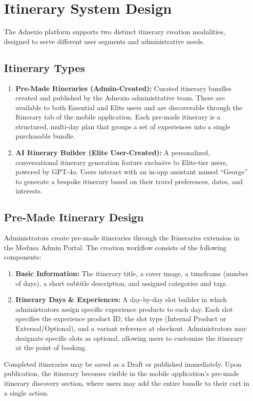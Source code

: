 \section{Itinerary System Design}
The Adnexio platform supports two distinct itinerary creation modalities, designed to serve different user segments and administrative needs.

\newpage
\subsection{Itinerary Types}
\begin{enumerate}
    \item \textbf{Pre-Made Itineraries (Admin-Created):} Curated itinerary bundles created and published by the Adnexio administrative team. These are available to both Essential and Elite users and are discoverable through the Itinerary tab of the mobile application. Each pre-made itinerary is a structured, multi-day plan that groups a set of experiences into a single purchasable bundle.
    \item \textbf{AI Itinerary Builder (Elite User-Created):} A personalized, conversational itinerary generation feature exclusive to Elite-tier users, powered by GPT-4o. Users interact with an in-app assistant named ``George'' to generate a bespoke itinerary based on their travel preferences, dates, and interests.
\end{enumerate}

\subsection{Pre-Made Itinerary Design}
Administrators create pre-made itineraries through the Itineraries extension in the Medusa Admin Portal. The creation workflow consists of the following components:
\begin{enumerate}
    \item \textbf{Basic Information:} The itinerary title, a cover image, a timeframe (number of days), a short subtitle description, and assigned categories and tags.
    \item \textbf{Itinerary Days \& Experiences:} A day-by-day slot builder in which administrators assign specific experience products to each day. Each slot specifies the experience product ID, the slot type (Internal Product or External/Optional), and a variant reference at checkout. Administrators may designate specific slots as optional, allowing users to customize the itinerary at the point of booking.
\end{enumerate}
Completed itineraries may be saved as a Draft or published immediately. Upon publication, the itinerary becomes visible in the mobile application's pre-made itinerary discovery section, where users may add the entire bundle to their cart in a single action.

